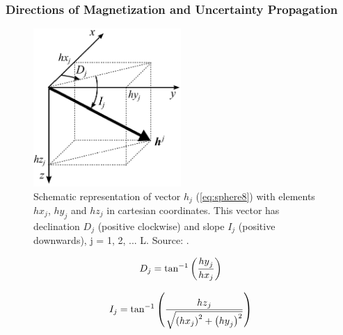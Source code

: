 \documentclass[manuscript,revised]{geophysics}
\begin{document}
\begin{FlushRight}
\end{FlushRight}




\subsubsection{Directions of Magnetization and Uncertainty Propagation}


\begin{figure}[htbp]
\centering
\includegraphics[width=0.5\textwidth]{VECTORS.png}
\caption{Schematic representation of vector $h_j$ (\cref{eq:sphere8}) with elements $hx_j$, $hy_j$ and $hz_j$ in cartesian coordinates. This vector has declination $D_j$ (positive clockwise) and slope $I_j$ (positive downwards), j = 1, 2, ... L. Source: \cite{OliveiraJr.2015}.}
\label{fig:VECTORS}
\end{figure}


\begin{equation} \label{eq:sphere16}
\centering
\small D_j=\tan^{-1}{\left(\frac{{hy}_j}{{hx}_j}\right)}
\end{equation}

\begin{equation} \label{eq:sphere17}
\centering
\small I_j=\tan^{-1}{\left(\frac{{hz}_j}{\sqrt{\left({hx}_j\right)^2+\left({hy}_j\right)^2}}\right)}
\end{equation}
\end{document}
